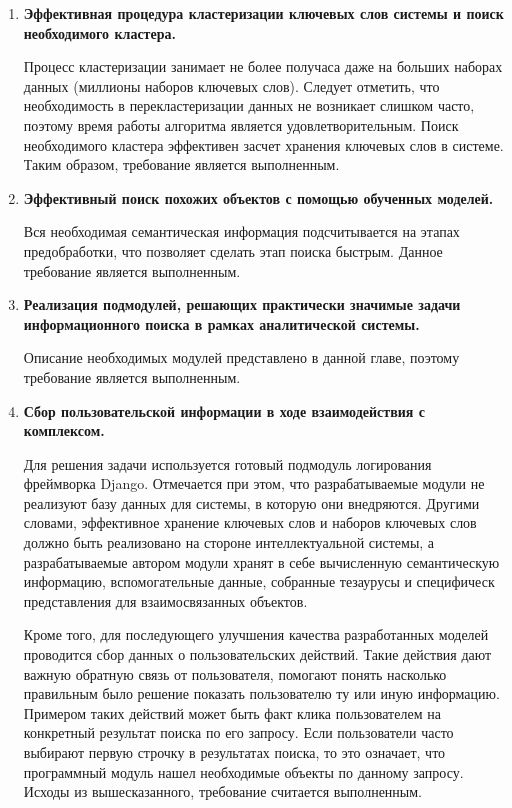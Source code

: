 \begin{enumerate}
\begin{enumerate}[label*=\arabic*.]
        \item \textbf{Эффективная процедура кластеризации ключевых слов системы и поиск необходимого кластера.}

            Процесс кластеризации занимает не более получаса даже на больших наборах данных (миллионы наборов ключевых слов). Следует отметить, что необходимость в перекластеризации данных не возникает слишком часто, поэтому время работы алгоритма является удовлетворительным. Поиск необходимого кластера эффективен засчет хранения ключевых слов в системе. Таким образом, требование является выполненным.
        \item \textbf{Эффективный поиск похожих объектов с помощью обученных моделей.}

            Вся необходимая семантическая информация подсчитывается на этапах предобработки, что позволяет сделать этап поиска быстрым. Данное требование является выполненным.

        \item \textbf{Реализация подмодулей, решающих практически значимые задачи информационного поиска в рамках аналитической системы.}

            Описание необходимых модулей представлено в данной главе, поэтому требование является выполненным.

        \item \textbf{Сбор пользовательской информации в ходе взаимодействия с комплексом.}

            Для решения задачи используется готовый подмодуль логирования фреймворка Django. Отмечается при этом, что разрабатываемые модули не реализуют базу данных для системы, в которую они внедряются. Другими словами, эффективное хранение ключевых слов и наборов ключевых слов должно быть реализовано на стороне интеллектуальной системы, а разрабатываемые автором модули хранят в себе вычисленную семантическую информацию, вспомогательные данные, собранные тезаурусы и специфическ представления для взаимосвязанных объектов. 
            
            Кроме того, для последующего улучшения качества разработанных моделей проводится сбор данных о пользовательских действий. Такие действия дают важную обратную связь от пользователя, помогают понять насколько правильным было решение показать пользователю ту или иную информацию. Примером таких действий может быть факт клика пользователем на конкретный результат поиска по его запросу. Если пользователи часто выбирают первую строчку в результатах поиска, то это означает, что программный модуль нашел необходимые объекты по данному запросу. Исходы из вышесказанного, требование считается выполненным.


\end{enumerate}
\end{enumerate}
